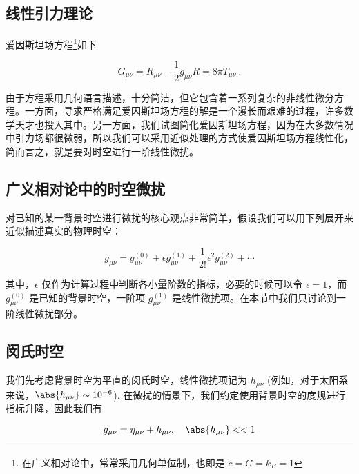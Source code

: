 
\begin{issues}
\issueMissDepend
\issueDraft
\end{issues}



\subsection{线性引力理论}
爱因斯坦场方程\footnote{在广义相对论中，常常采用几何单位制，也即是 $c=G=k_B=1$}如下

\begin{equation}\label{eq_LinGra_2}
G_{\mu \nu} = R_{\mu \nu} - \frac{1}{2}g_{\mu\nu}R = 8\pi T_{\mu\nu}~.
\end{equation}

由于方程采用几何语言描述，十分简洁，但它包含着一系列复杂的非线性微分方程。一方面，寻求严格满足爱因斯坦场方程的解是一个漫长而艰难的过程，许多数学天才也投入其中。另一方面，我们试图简化爱因斯坦场方程，因为在大多数情况中引力场都很微弱，所以我们可以采用近似处理的方式使爱因斯坦场方程线性化，简而言之，就是要对时空进行一阶线性微扰。


\subsection{广义相对论中的时空微扰}

对已知的某一背景时空进行微扰的核心观点非常简单，假设我们可以用下列展开来近似描述真实的物理时空：

\begin{equation}
g_{\mu\nu}=g^{(0)}_{\mu\nu} + \epsilon g^{(1)}_{\mu\nu} + \frac{1}{2!}\epsilon^2 g^{(2)}_{\mu\nu}+\cdots
\end{equation}

其中，$\epsilon $ 仅作为计算过程中判断各小量阶数的指标，必要的时候可以令 $\epsilon = 1 $，而 $g^{(0)}_{\mu\nu} $ 是已知的背景时空，一阶项 $g^{(1)}_{\mu\nu}$ 是线性微扰项。在本节中我们只讨论到一阶线性微扰部分。


\subsection{闵氏时空}

我们先考虑背景时空为平直的闵氏时空，线性微扰项记为 $h_{\mu\nu}$ (例如，对于太阳系来说，$\abs{h_{\mu\nu}} \sim 10^{-6}$). 在微扰的情景下，我们约定使用背景时空的度规进行指标升降，因此我们有

\begin{equation}
g_{\mu\nu} = \eta_{\mu\nu} + h_{\mu\nu}, \quad \abs{h_{\mu\nu}}<<1 
\end{equation}

